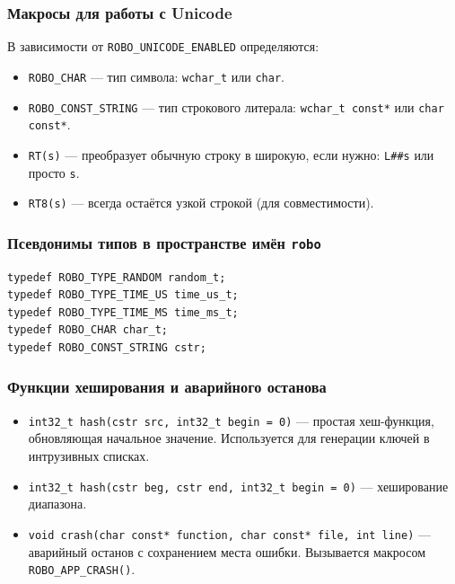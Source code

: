 \documentclass[a4paper,12pt]{article}
\begin{document}
\subsubsection{Макросы для работы с Unicode}

В зависимости от \texttt{ROBO\_UNICODE\_ENABLED} определяются:

\begin{itemize}
    \item \texttt{ROBO\_CHAR} — тип символа: \texttt{wchar\_t} или \texttt{char}.
    \item \texttt{ROBO\_CONST\_STRING} — тип строкового литерала: \texttt{wchar\_t const*} или \texttt{char const*}.
    \item \texttt{RT(s)} — преобразует обычную строку в широкую, если нужно: \texttt{L##s} или просто \texttt{s}.
    \item \texttt{RT8(s)} — всегда остаётся узкой строкой (для совместимости).
\end{itemize}

\subsubsection{Псевдонимы типов в пространстве имён \texttt{robo}}

\begin{lstlisting}[caption={Basic type aliases}]
typedef ROBO_TYPE_RANDOM random_t;
typedef ROBO_TYPE_TIME_US time_us_t;
typedef ROBO_TYPE_TIME_MS time_ms_t;
typedef ROBO_CHAR char_t;
typedef ROBO_CONST_STRING cstr;
\end{lstlisting}

\subsubsection{Функции хеширования и аварийного останова}

\begin{itemize}
    \item \texttt{int32\_t hash(cstr src, int32\_t begin = 0)} — простая хеш-функция, обновляющая начальное значение. Используется для генерации ключей в интрузивных списках.
    \item \texttt{int32\_t hash(cstr beg, cstr end, int32\_t begin = 0)} — хеширование диапазона.
    \item \texttt{void crash(char const* function, char const* file, int line)} — аварийный останов с сохранением места ошибки. Вызывается макросом \texttt{ROBO\_APP\_CRASH()}.
\end{itemize}
\end{document}
